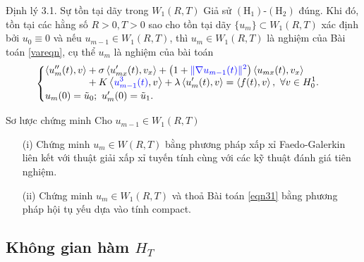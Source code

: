 \documentclass[9pt]{beamer}
\begin{document}
\begin{frame}
    \begin{block}{Định lý 3.1. Sự tồn tại dãy trong $W_1(R,T)$}
    Giả sử $(\text{H}_1)$-$(\text{H}_2)$ đúng. Khi đó, tồn tại các hằng số $R > 0, T > 0$ sao cho tồn tại dãy $\{u_m\} \subset W_1(R,T)$ xác định bởi $u_0 \equiv 0$ và nếu $u_{m-1} \in W_1(R,T)$, thì $u_m \in W_1(R,T)$ là nghiệm của Bài toán \eqref{vareqn}, cụ thể $u_m$ là nghiệm của bài toán
    \begin{align} \label{eqn31}
    \begin{cases}
        \begin{aligned}
            \left< u''_m(t), v \right>
        &+ \sigma \left< u'_{mx}(t), v_x \right>
        + \left(1 + \textcolor{blue}{\|\nabla u_{m-1}(t)\|^2}\right) \left< u_{mx}(t), v_x \right> \\
        &+ K \left< \textcolor{blue}{u^3_{m-1}(t)}, v \right> + \lambda \left< u'_m(t), v \right>
        = \left< f(t), v \right>,\ \forall v \in H^1_0.
        \end{aligned} \\
        u_m(0) = \tilde{u}_0; \  u'_m(0) = \tilde{u}_1.
    \end{cases}
    \end{align}
    \end{block}

    \begin{exampleblock}{Sơ lược chứng minh}
        Cho $u_{m-1} \in W_1(R,T)$
        \begin{itemize}
            \item[(i)] Chứng minh $u_m \in W(R,T)$ bằng phương pháp xấp xỉ Faedo-Galerkin liên kết với thuật giải xấp xỉ tuyến tính cùng với các kỹ thuật đánh giá tiên nghiệm.
            \item[(ii)] Chứng minh $u_m \in W_1(R,T)$ và thoả Bài toán \eqref{eqn31} bằng phương pháp hội tụ yếu dựa vào tính compact.
        \end{itemize}
    \end{exampleblock}
\end{frame}

\subsection{Không gian hàm $H_T$}
\end{document}
